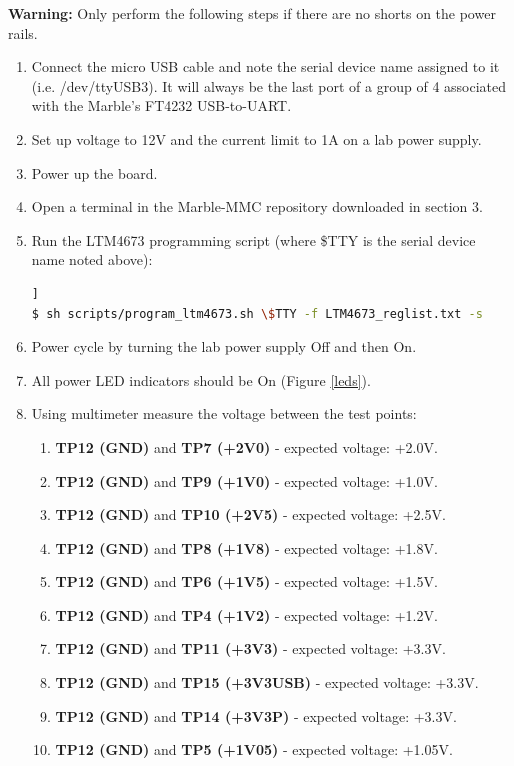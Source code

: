 \documentclass[12pt,oneside,a4]{article}
\begin{document}
\textbf{Warning:} Only perform the following steps if there are no shorts on the power rails.
\begin{enumerate}
    \item Connect the micro USB cable and note the serial device name assigned to it (i.e. /dev/ttyUSB3).  It will always be the last port of a group of 4 associated with the Marble's FT4232 USB-to-UART.
    \item Set up voltage to 12V and the current limit to 1A on a lab power supply.
    \item Power up the board.
    \item Open a terminal in the Marble-MMC repository downloaded in section 3.
    \item Run the LTM4673 programming script (where \$TTY is the serial device name noted above):
      \begin{lstlisting}[backgroundcolor = \color{Gainsboro}, language=bash, frame=none]]
$ sh scripts/program_ltm4673.sh \$TTY -f LTM4673_reglist.txt -s
      \end{lstlisting}
    \item Power cycle by turning the lab power supply Off and then On.
    \item All power LED indicators should be On (Figure \ref{leds}).
    \item Using multimeter measure the voltage between the test points:
    \begin{enumerate}
    	\item \textbf{TP12 (GND)} and \textbf{TP7 (+2V0)} - expected voltage: +2.0V.
    	\item \textbf{TP12 (GND)} and \textbf{TP9 (+1V0)} - expected voltage: +1.0V.
    	\item \textbf{TP12 (GND)} and \textbf{TP10 (+2V5)} - expected voltage: +2.5V.
    	\item \textbf{TP12 (GND)} and \textbf{TP8 (+1V8)} - expected voltage: +1.8V.
    	\item \textbf{TP12 (GND)} and \textbf{TP6 (+1V5)} - expected voltage: +1.5V.
    	\item \textbf{TP12 (GND)} and \textbf{TP4 (+1V2)} - expected voltage: +1.2V.
    	\item \textbf{TP12 (GND)} and \textbf{TP11 (+3V3)} - expected voltage: +3.3V.
    	\item \textbf{TP12 (GND)} and \textbf{TP15 (+3V3USB)} - expected voltage: +3.3V.
    	\item \textbf{TP12 (GND)} and \textbf{TP14 (+3V3P)} - expected voltage: +3.3V.
    	\item \textbf{TP12 (GND)} and \textbf{TP5 (+1V05)} - expected voltage: +1.05V.
\end{enumerate}
\end{enumerate}
\end{document}
